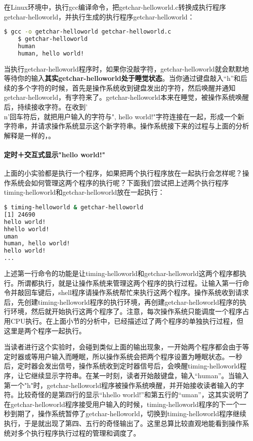 在Linux环境中，执行gcc编译命令，把getchar-helloworld.c转换成执行程序getchar-helloworld，并执行生成的执行程序getchar-helloworld：
\begin{lstlisting}[language={bash}]
	$ gcc -o getchar-helloworld getchar-helloworld.c
	$ getchar-helloworld
	human
	human, hello world!	
\end{lstlisting}

当执行getchar-helloworld程序时，如果你没敲字符，getchar-helloworld就会默默地等待你的输入\textbf{其实getchar-helloworld处于睡觉状态}。当你通过键盘敲入“h”和后续的多个字符的时候，首先是操作系统收到键盘发出的字符，然后唤醒并通知getchar-helloworld，有字符来了。getchar-helloworld本来在睡觉，被操作系统唤醒后，持续接收字符。在收到'\\n'回车符后，就把用户输入的字符与", hello world!"字符连接在一起，形成一个新字符串，并请求操作系统显示这个新字符串。操作系统接下来的过程与上面的分析解释是一样的，。

\paragraph{定时＋交互式显示"hello world!"}
上面的小实验都是执行一个程序，如果把两个执行程序放在一起执行会怎样呢？操作系统会如何管理这两个程序的执行呢？下面我们尝试把上述两个执行程序timing-helloworld和getchar-helloworld放在一起执行：
\begin{lstlisting}[language={bash}]
$ timing-helloworld & getchar-helloworld
[1] 24690
hello world!
hhello world!
uman
human, hello world!
hello world!
...
\end{lstlisting}

上述第一行命令的功能是让timing-helloworld和getchar-helloworld这两个程序都执行。所谓都执行，就是让操作系统来管理这两个程序的执行过程。让输入第一行命令并敲回车键后，shell程序请操作系统帮忙来执行这两个程序。操作系统收到请求后，先创建timing-helloworld程序的执行环境，再创建getchar-helloworld程序的执行环境，然后就开始执行这两个程序了。注意，每次操作系统只能调度一个程序占用CPU执行。在上面小节的分析中，已经描述过了两个程序的单独执行过程，但这里是两个程序一起执行。

当读者进行这个实验时，会碰到类似上面的输出现象，一开始两个程序都会由于等定时器或等用户输入而睡眠，所以操作系统会把两个程序设置为睡眠状态。一秒后，定时器会发出信号，操作系统收到定时器信号后，会唤醒timing-helloworld程序，让它继续显示字符串。在某一时刻，读者开始敲键盘，输入“human”。当输入第一个"h"时，getchar-helloworld程序被操作系统唤醒，并开始接收读者输入的字符。比较奇怪的是第四行的显示“hhello world!”和第五行的“uman”，这其实说明了在getchar-helloworld程序接受用户输入的时候，timing-helloworld程序的下一个一秒到期了，操作系统暂停了getchar-helloworld，切换到timing-helloworld程序继续执行，于是就出现了第四、五行的奇怪输出了。这里总算比较直观地能看到操作系统对多个执行程序执行过程的管理和调度了。

